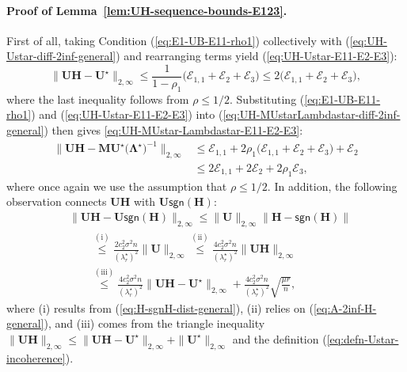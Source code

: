 \paragraph{Proof of Lemma~\ref{lem:UH-sequence-bounds-E123}.}
First of all, taking Condition (\ref{eq:E1-UB-E11-rho1}) collectively with (\ref{eq:UH-Ustar-diff-2inf-general})
and rearranging terms yield (\ref{eq:UH-Ustar-E11-E2-E3}):
%
\begin{equation}
\big\|\bm{U}\bm{H}-\bm{U}^{\star}\big\|_{2,\infty}\leq\frac{1}{1-\rho_{1}}\big(\mathcal{E}_{1,1}+\mathcal{E}_{2}+\mathcal{E}_{3}\big)\leq2\big(\mathcal{E}_{1,1}+\mathcal{E}_{2}+\mathcal{E}_{3}\big),\label{eq:UH-Ustar-E11-E2-E3-1}
\end{equation}
where the last inequality follows from $\rho\leq 1/2$. Substituting (\ref{eq:E1-UB-E11-rho1}) and (\ref{eq:UH-Ustar-E11-E2-E3})
into (\ref{eq:UH-MUstarLambdastar-diff-2inf-general}) then gives \eqref{eq:UH-MUstar-Lambdastar-E11-E2-E3}:
%
\begin{align}
\big\|\bm{U}\bm{H}-\bm{M}\bm{U}^{\star}\big(\bm{\Lambda}^{\star}\big)^{-1}\big\|_{2,\infty} & \leq\mathcal{E}_{1,1}+2\rho_{1}\big(\mathcal{E}_{1,1}+\mathcal{E}_{2}+\mathcal{E}_{3}\big)+\mathcal{E}_{2}\nonumber \\
 & \leq2\mathcal{E}_{1,1}+2\mathcal{E}_{2}+2\rho_{1}\mathcal{E}_{3},\label{eq:UH-MUstar-Lambdastar-E11-E2-E3-1}
\end{align}
where once again we use the assumption that $\rho\leq 1/2$. 
In addition, the following observation connects $\bm{U}\bm{H}$ with
$\bm{U}\mathsf{sgn}(\bm{H})$:
%
\begin{align}
 & \big\|\bm{U}\bm{H}-\bm{U}\mathsf{sgn}(\bm{H})\big\|_{2,\infty}
   \leq \|\bm{U}\|_{2,\infty}\big\|\bm{H}-\mathsf{sgn}(\bm{H})\big\|\nonumber \\
 & \qquad \overset{(\mathrm{i})}{\leq}\frac{2c_{2}^{2}\sigma^{2}n}{(\lambda_{r}^{\star})^{2}}\big\|\bm{U}\big\|_{2,\infty}\overset{(\mathrm{ii})}{\leq}\frac{4c_{2}^{2}\sigma^{2}n}{(\lambda_{r}^{\star})^{2}}\big\|\bm{U}\bm{H}\big\|_{2,\infty}\nonumber \\
 & \qquad \overset{(\mathrm{iii})}{\leq}\frac{4c_{2}^{2}\sigma^{2}n}{(\lambda_{r}^{\star})^{2}}\big\|\bm{U}\bm{H}-\bm{U}^{\star}\big\|_{2,\infty}+\frac{4c_{2}^{2}\sigma^{2}n}{(\lambda_{r}^{\star})^{2}}\sqrt{\frac{\mu r}{n}},
 \label{eq:UH-UsgnH-bound-iterate}
\end{align}
%
where (i) results from (\ref{eq:H-sgnH-dist-general}), (ii) relies on (\ref{eq:A-2inf-H-general}), and (iii) comes from the triangle
inequality $\|\bm{U}\bm{H}\|_{2,\infty}\leq \|\bm{U}\bm{H}-\bm{U}^{\star}\|_{2,\infty} + \|\bm{U}^{\star} \|_{2,\infty}$
and the definition (\ref{eq:defn-Ustar-incoherence}).

